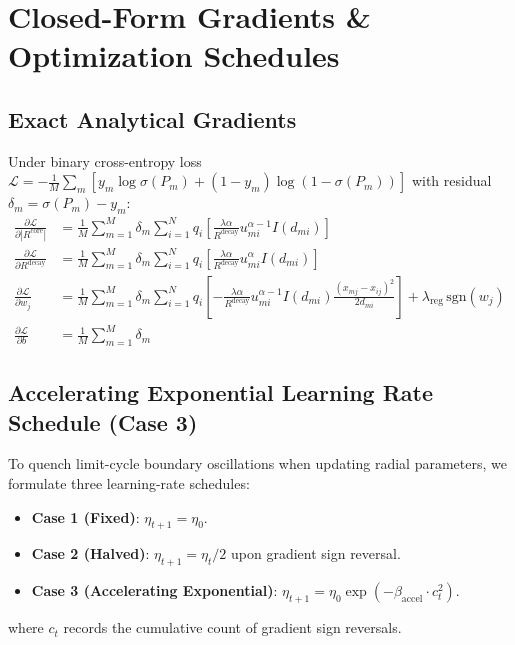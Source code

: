 \documentclass[preprint,review,12pt]{elsarticle}
\newcommand{\FloatBarrier}{\clearpage}
\begin{document}
\FloatBarrier

\section{Closed-Form Gradients \& Optimization Schedules}

\subsection{Exact Analytical Gradients}
Under binary cross-entropy loss $\mathcal{L} = -\frac{1}{M}\sum_m [y_m \log \sigma(P_m) + (1-y_m)\log(1-\sigma(P_m))]$ with residual $\delta_m = \sigma(P_m) - y_m$:
\begin{align}
\frac{\partial \mathcal{L}}{\partial |R^{\mathrm{core}}|} &= \frac{1}{M}\sum_{m=1}^{M} \delta_m \sum_{i=1}^{N} q_i \left[ \frac{\lambda \alpha}{R^{\mathrm{decay}}} u_{mi}^{\alpha-1} I(d_{mi}) \right] \\
\frac{\partial \mathcal{L}}{\partial R^{\mathrm{decay}}} &= \frac{1}{M}\sum_{m=1}^{M} \delta_m \sum_{i=1}^{N} q_i \left[ \frac{\lambda \alpha}{R^{\mathrm{decay}}} u_{mi}^{\alpha} I(d_{mi}) \right] \\
\frac{\partial \mathcal{L}}{\partial w_j} &= \frac{1}{M}\sum_{m=1}^{M} \delta_m \sum_{i=1}^{N} q_i \left[ -\frac{\lambda \alpha}{R^{\mathrm{decay}}} u_{mi}^{\alpha-1} I(d_{mi}) \frac{(x_{mj} - x_{ij})^2}{2 d_{mi}} \right] + \lambda_{\mathrm{reg}}\,\mathrm{sgn}(w_j) \\
\frac{\partial \mathcal{L}}{\partial b} &= \frac{1}{M}\sum_{m=1}^{M} \delta_m
\end{align}

\subsection{Accelerating Exponential Learning Rate Schedule (Case 3)}
To quench limit-cycle boundary oscillations when updating radial parameters, we formulate three learning-rate schedules:
\begin{itemize}
    \item \textbf{Case 1 (Fixed)}: $\eta_{t+1} = \eta_0$.
    \item \textbf{Case 2 (Halved)}: $\eta_{t+1} = \eta_t / 2$ upon gradient sign reversal.
    \item \textbf{Case 3 (Accelerating Exponential)}: $\eta_{t+1} = \eta_0 \exp(-\beta_{\mathrm{accel}} \cdot c_t^2)$.
\end{itemize}
where $c_t$ records the cumulative count of gradient sign reversals.
\end{document}
